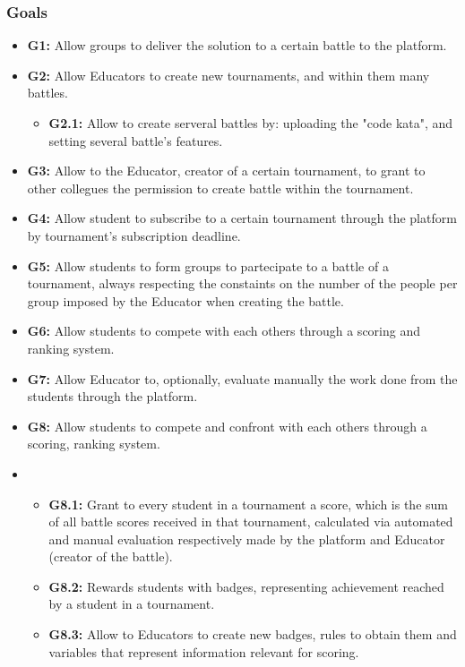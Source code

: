 \documentclass{article}
\begin{document}
        \subsubsection{Goals}
            \begin{itemize}
                \item[] {\large\textbf{G1:}} Allow groups to deliver the solution to a certain battle to the platform.
                \item[] {\large\textbf{G2:}} Allow Educators to create new tournaments, and within them many battles.
                \begin{itemize}
                    \item[] {\large\textbf{G2.1:}} Allow to create serveral battles by: uploading the "code kata", and setting several battle's features.
                \end{itemize}
                \item[] {\large\textbf{G3:}} Allow to the Educator, creator of a certain tournament, to grant to other collegues the permission to create battle within the tournament.
                \item[] {\large\textbf{G4:}} Allow student to subscribe to a certain tournament through the platform by tournament's subscription deadline.
                \item[] {\large\textbf{G5:}} Allow students to form groups to partecipate to a battle of a tournament, always respecting the constaints on the number of the people per group imposed by the Educator when creating the battle.
                \item[] {\large\textbf{G6:}} Allow students to compete with each others through a scoring and ranking system.
                \item[] {\large\textbf{G7:}} Allow Educator to, optionally, evaluate manually the work done from the students through the platform.
                \item[] {\large\textbf{G8:}} Allow students to compete and confront with each others through a scoring, ranking system.
                \item[] \begin{itemize}
                    \item[] {\large\textbf{G8.1:}} Grant to every student in a tournament a score, which is the sum of all battle scores received in that tournament, calculated via automated and manual evaluation respectively made by the platform and Educator (creator of the battle).
                    \item[] {\large\textbf{G8.2:}} Rewards students with badges, representing achievement reached by a student in a tournament.
                    \item[] {\large\textbf{G8.3:}} Allow to Educators to create new badges, rules to obtain them and variables that represent information relevant for scoring. 
                \end{itemize}
            \end{itemize}
\end{document}
